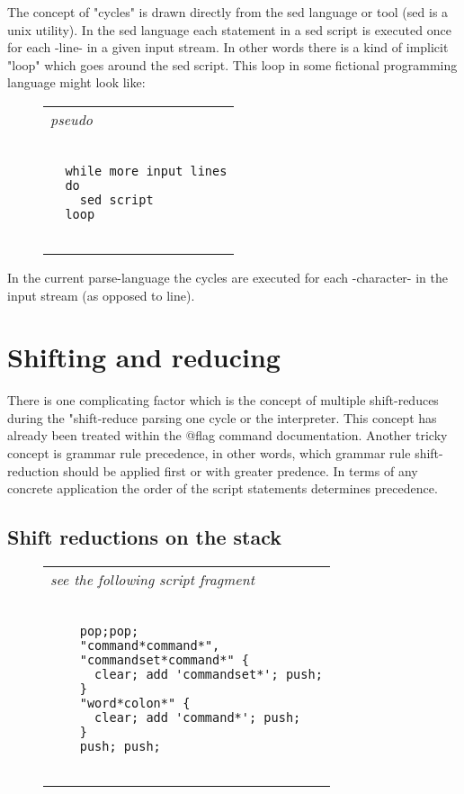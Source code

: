 \documentclass[a4paper,12pt]{article}
\begin{document}
 The concept of "cycles" is drawn directly from the sed
 language or tool (sed is a unix utility). In the sed language
 each statement in a sed script is executed once for each -line-
 in a given input stream. In other words there is a kind of
 implicit "loop" which goes around the sed script. This loop in some
 fictional programming language might look like:
 \begin{figure}
 \begin{tabular}{ l }
 \emph{ pseudo } \\ 
 \begin{lstlisting}[breaklines] 

  while more input lines
  do
    sed script
  loop
 
 \end{lstlisting} 
 \end{tabular} 

 \end{figure}

 In the current parse-language the cycles are executed for each
 -character- in the input stream (as opposed to line).
 
\section{Shifting and reducing}

 There is one complicating factor which is the concept of multiple
 shift-reduces during the "shift-reduce parsing one cycle or the
 interpreter. This concept has already been treated within the @flag command
 documentation. Another tricky concept is grammar rule precedence, in other
 words, which grammar rule shift-reduction should be applied first or with
 greater predence. In terms of any concrete application the order of the
 script statements determines precedence.
 
\subsection{Shift reductions on the stack}
 \begin{figure}
 \begin{tabular}{ l }
 \emph{ see the following script fragment  } \\ 
 \begin{lstlisting}[breaklines] 

    pop;pop;
    "command*command*",
    "commandset*command*" { 
      clear; add 'commandset*'; push;
    }
    "word*colon*" {
      clear; add 'command*'; push; 
    }      
    push; push;
  
 \end{lstlisting} 
 \end{tabular} 

 \end{figure}
\end{document}

